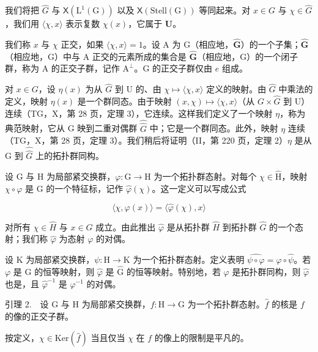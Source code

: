 我们将把 \(\widehat{G}\) 与 \(\mathsf{X}(\mathrm{L}^1 (\mathrm{G}))\) 以及 \(\mathsf{X}(\mathrm{Stell}(\mathrm{G}))\) 等同起来。对 \(x\in G\) 与 \(\chi \in \widehat{G}\)，我们用 \(\langle \chi ,x\rangle\) 表示复数 \(\chi (x)\)，它属于 \(\mathbf{U}\)。

我们称 \(x\) 与 \(\chi\) 正交，如果 \(\langle \chi, x \rangle = 1\)。设 A 为 G（相应地，\(\widehat{\mathbf{G}}\)）的一个子集；\(\widehat{\mathbf{G}}\)（相应地，G）中与 A 正交的元素所成的集合是 \(\widehat{\mathbf{G}}\)（相应地，G）的一个闭子群，称为 A 的正交子群，记作 \(\mathrm{A}^{\perp}\)。G 的正交子群仅由 \(e\) 组成。

对 \(x \in G\)，设 \(\eta(x)\) 为从 \(\widehat{G}\) 到 U 的、由 \(\chi \mapsto \langle \chi, x \rangle\) 定义的映射。由 \(\widehat{G}\) 中乘法的定义，映射 \(\eta(x)\) 是一个群同态。由于映射 \((x, \chi) \mapsto \langle \chi, x \rangle\)（从 \(G \times \widehat{G}\) 到 U）连续（TG，X，第 28 页，定理 3），它连续。这样我们定义了一个映射 \(\eta\)，称为典范映射，它从 G 映到二重对偶群 \(\widehat{\widehat{G}}\) 中；它是一个群同态。此外，映射 \(\eta\) 连续（TG，X，第 28 页，定理 3）。我们稍后将证明（II，第 220 页，定理 2）\(\eta\) 是从 G 到 \(\widehat{\widehat{G}}\) 上的拓扑群同构。

设 G 与 H 为局部紧交换群，\(\varphi\colon\mathrm{G}\to\mathrm{H}\) 为一个拓扑群态射。对每个 \(\chi\in\widehat{\mathrm{H}}\)，映射 \(\chi\circ\varphi\) 是 G 的一个特征标，记作 \(\widehat{\varphi}(\chi)\)。这一定义可以写成公式

\[
\langle \chi , \varphi (x) \rangle = \langle \widehat {\varphi} (\chi), x \rangle\tag{4}
\]

对所有 \(\chi\in\widehat{H}\) 与 \(x\in G\) 成立。由此推出 \(\widehat{\varphi}\) 是从拓扑群 \(\widehat{H}\) 到拓扑群 \(\widehat{G}\) 的一个态射；我们称 \(\widehat{\varphi}\) 为态射 \(\varphi\) 的对偶。

设 K 为局部紧交换群，\(\psi\colon\mathrm{H}\to\mathrm{K}\) 为一个拓扑群态射。定义表明 \(\widehat{\psi\circ\varphi}=\widehat{\varphi}\circ\widehat{\psi}\)。若 \(\varphi\) 是 G 的恒等映射，则 \(\widehat{\varphi}\) 是 \(\widehat{\mathrm{G}}\) 的恒等映射。特别地，若 \(\varphi\) 是拓扑群同构，则 \(\widehat{\varphi}\) 也是，且 \(\widehat{\varphi}^{-1}\) 是 \(\varphi^{-1}\) 的对偶。

引理 2.　设 G 与 H 为局部紧交换群，\(f\colon\mathrm{H}\to\mathrm{G}\) 为一个拓扑群态射。\(\widehat{f}\) 的核是 \(f\) 的像的正交子群。

按定义，\(\chi \in \mathrm{Ker}(\widehat{f})\) 当且仅当 \(\chi\) 在 \(f\) 的像上的限制是平凡的。

